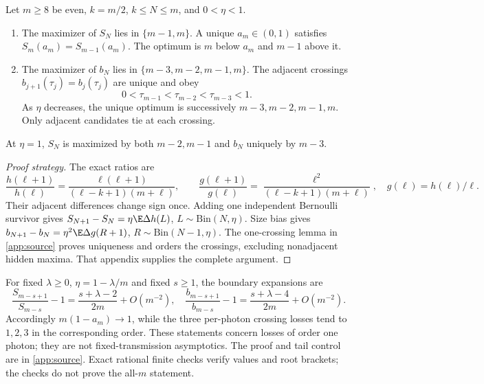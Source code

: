 \begin{theorem}\label{thm:source}
Let $m\ge8$ be even, $k=m/2$, $k\le N\le m$, and $0<\eta<1$.
\begin{enumerate}
\item The maximizer of $S_N$ lies in $\{m-1,m\}$. A unique $a_m\in(0,1)$ satisfies $S_m(a_m)=S_{m-1}(a_m)$. The optimum is $m$ below $a_m$ and $m-1$ above it.
\item The maximizer of $b_N$ lies in $\{m-3,m-2,m-1,m\}$. The adjacent crossings $b_{j+1}(\tau_j)=b_j(\tau_j)$ are unique and obey
\begin{equation}
 0<\tau_{m-1}<\tau_{m-2}<\tau_{m-3}<1.
\end{equation}
As $\eta$ decreases, the unique optimum is successively $m-3,m-2,m-1,m$. Only adjacent candidates tie at each crossing.
\end{enumerate}
At $\eta=1$, $S_N$ is maximized by both $m-2,m-1$ and $b_N$ uniquely by $m-3$.
\end{theorem}
\begin{proof}[Proof strategy]
The exact ratios are
\begin{equation}
 \frac{h(\ell+1)}{h(\ell)}=\frac{\ell(\ell+1)}{(\ell-k+1)(m+\ell)},\qquad
 \frac{g(\ell+1)}{g(\ell)}=\frac{\ell^2}{(\ell-k+1)(m+\ell)},\quad g(\ell)=h(\ell)/\ell.
\end{equation}
Their adjacent differences change sign once. Adding one independent Bernoulli survivor gives $S_{N+1}-S_N=\eta\E\Delta h(L)$, $L\sim\mathrm{Bin}(N,\eta)$. Size bias gives $b_{N+1}-b_N=\eta^2\E\Delta g(R+1)$, $R\sim\mathrm{Bin}(N-1,\eta)$. The one-crossing lemma in \cref{app:source} proves uniqueness and orders the crossings, excluding nonadjacent hidden maxima. That appendix supplies the complete argument.
\end{proof}

For fixed $\lambda\ge0$, $\eta=1-\lambda/m$ and fixed $s\ge1$, the boundary expansions are
\begin{equation}
 \frac{S_{m-s+1}}{S_{m-s}}-1=\frac{s+\lambda-2}{2m}+O(m^{-2}),\quad
 \frac{b_{m-s+1}}{b_{m-s}}-1=\frac{s+\lambda-4}{2m}+O(m^{-2}).\label{eq:boundary}
\end{equation}
Accordingly $m(1-a_m)\to1$, while the three per-photon crossing losses tend to $1,2,3$ in the corresponding order. These statements concern losses of order one photon; they are not fixed-transmission asymptotics. The proof and tail control are in \cref{app:source}. Exact rational finite checks verify \SourceProbabilityCount{} values and \SourceBracketCount{} root brackets; the checks do not prove the all-$m$ statement.

